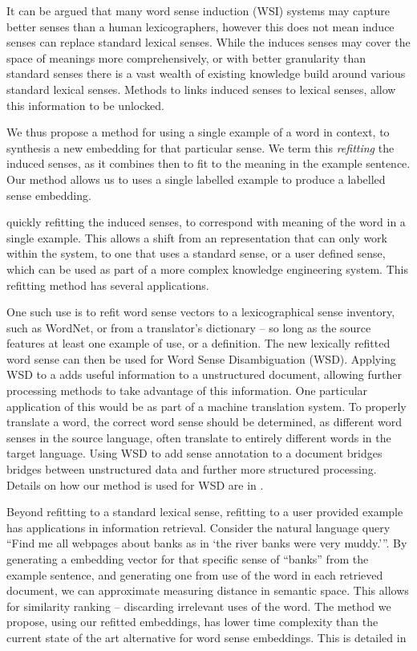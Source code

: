 \documentclass{sig-alternate}
\begin{document}
It can be argued that many word sense induction (WSI) systems may capture better senses than a human lexicographers, however this does not mean induce senses can replace standard lexical senses. While the induces senses may cover the space of meanings more comprehensively, or with better granularity than standard senses there is a vast wealth of existing knowledge build around various standard lexical senses. Methods to links induced senses to lexical senses, allow this information to be unlocked.

We thus propose a method for using a single example of a word in context, to synthesis a new embedding for that particular sense. We term this \emph{refitting} the induced senses, as it combines then to fit to the meaning in the example sentence. Our method allows us to uses a single labelled example to produce a labelled sense embedding.

quickly refitting the induced senses, to correspond with meaning of the word in a single example. This allows a shift from an representation that can only work within the system, to one that uses a standard sense, or a user defined sense, which can be used as part of a more complex knowledge engineering system. This refitting method  has several applications.


One such use is to refit word sense vectors to a lexicographical sense inventory, such as WordNet, or from a translator's dictionary -- so long as the source features at least one example of use, or a definition. The new lexically refitted word sense can then be used for Word Sense Disambiguation (WSD). Applying WSD to a adds useful information to a unstructured document, allowing further processing methods to take advantage of this information. One particular application of this would be as part of a machine translation system. To properly translate a word, the correct word sense should be determined, as different word senses in the source language, often translate to entirely different words in the target language. Using WSD to add sense annotation to a document bridges bridges between unstructured data and further more structured processing.
Details on how our method is used for WSD are in .

Beyond refitting to a standard lexical sense, refitting to a user provided example has applications in information retrieval. Consider the natural language query \enquote{Find me all webpages about banks as in \enquote{the river banks were very muddy.}}. By generating a embedding vector for that specific sense of ``banks'' from the example sentence, and generating one from use of the word in each retrieved document, we can approximate measuring distance in semantic space. This allows for similarity ranking -- discarding irrelevant uses of the word. The method we propose, using our refitted embeddings, has lower time complexity than the current state of the art alternative for word sense embeddings. This is detailed in 
\end{document}
